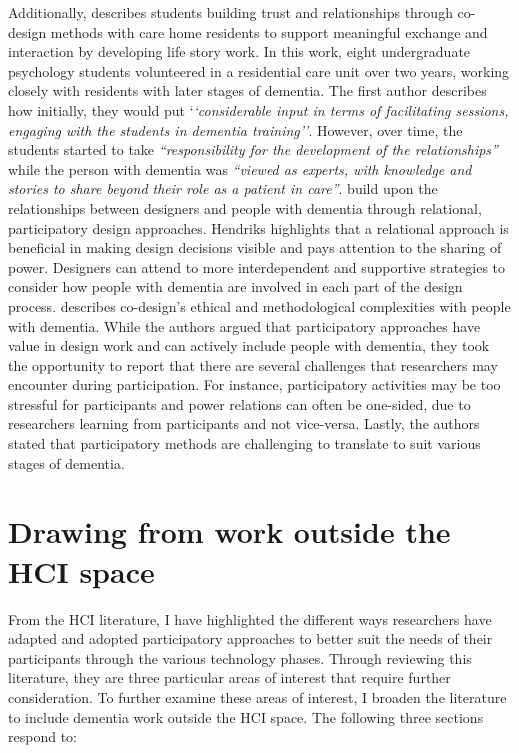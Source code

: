 Additionally, \cite{foley_student_2020} describes students building trust and relationships through co-design methods with care home residents to support meaningful exchange and interaction by developing life story work. In this work, eight undergraduate psychology students volunteered in a residential care unit over two years, working closely with residents with later stages of dementia. The first author describes how initially, they would put `\textit{`considerable input in terms of facilitating sessions, engaging with the students in dementia training''}. However, over time, the students started to take \textit{``responsibility for the development of the relationships''} while the person with dementia was \textit{``viewed as experts, with knowledge and stories to share beyond their role as a patient in care''\citep[pg.9]{foley_student_2020}}. \cite{hendriks_valuing_2018} build upon the relationships between designers and people with dementia through relational, participatory design approaches. Hendriks highlights that a relational approach is beneficial in making design decisions visible and pays attention to the sharing of power. Designers can attend to more interdependent and supportive strategies to consider how people with dementia are involved in each part of the design process. \cite{hendriks_challenges_2014} describes co-design's ethical and methodological complexities with people with dementia. While the authors argued that participatory approaches have value in design work and can actively include people with dementia, they took the opportunity to report that there are several challenges that researchers may encounter during participation. For instance, participatory activities may be too stressful for participants and power relations can often be one-sided, due to researchers learning from participants and not vice-versa. Lastly, the authors stated that participatory methods are challenging to translate to suit various stages of dementia.

\section{Drawing from work outside the HCI space}
\label{BL:Outside-HCI}
From the HCI literature, I have highlighted the different ways researchers have adapted and adopted participatory approaches to better suit the needs of their participants through the various technology phases. Through reviewing this literature, they are three particular areas of interest that require further consideration. To further examine these areas of interest, I broaden the literature to include dementia work outside the HCI space. The following three sections respond to:

